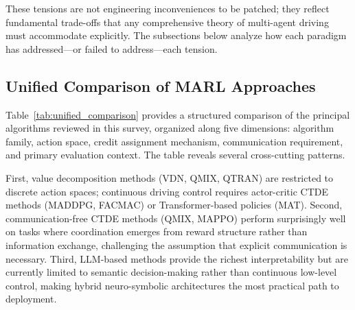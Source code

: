\documentclass[12pt, a4paper]{article}
\begin{document}
These tensions are not engineering inconveniences to be patched; they reflect
fundamental trade-offs that any comprehensive theory of multi-agent driving
must accommodate explicitly.  The subsections below analyze how each paradigm
has addressed---or failed to address---each tension.

\subsection{Unified Comparison of MARL Approaches}

Table~\ref{tab:unified_comparison} provides a structured comparison of the
principal algorithms reviewed in this survey, organized along five dimensions:
algorithm family, action space, credit assignment mechanism, communication
requirement, and primary evaluation context.  The table reveals several
cross-cutting patterns.

First, value decomposition methods (VDN, QMIX, QTRAN) are restricted to
discrete action spaces; continuous driving control requires actor-critic
CTDE methods (MADDPG, FACMAC) or Transformer-based policies (MAT).
Second, communication-free CTDE methods (QMIX, MAPPO) perform surprisingly
well on tasks where coordination emerges from reward structure rather than
information exchange, challenging the assumption that explicit communication
is necessary.  Third, LLM-based methods provide the richest interpretability
but are currently limited to semantic decision-making rather than continuous
low-level control, making hybrid neuro-symbolic architectures the most
practical path to deployment.
\end{document}
